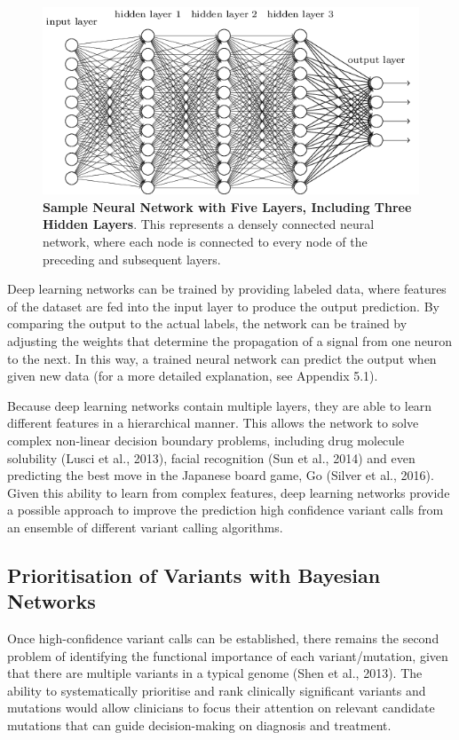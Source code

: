 \documentclass{article}
\begin{document}
\begin{figure}[H]
\includegraphics[width=\textwidth]{neuralnet.png}
\centering
\caption{\textbf{Sample Neural Network with Five Layers, Including Three Hidden Layers}. This represents a densely connected neural network, where each node is connected to every node of the preceding and subsequent layers.}
\end{figure}
Deep learning networks can be trained by providing labeled data, where features of the dataset are fed into the input layer to produce the output prediction. By comparing the output to the actual labels, the network can be trained by adjusting the weights that determine the propagation of a signal from one neuron to the next. In this way, a trained neural network can predict the output when given new data (for a more detailed explanation, see Appendix 5.1).

Because deep learning networks contain multiple layers, they are able to learn different features in a hierarchical manner. This allows the network to solve  complex non-linear decision boundary problems, including drug molecule solubility (Lusci et al., 2013), facial recognition (Sun et al., 2014) and even predicting the best move in the Japanese board game, Go (Silver et al., 2016). Given this ability to learn from complex features, deep learning networks provide a possible approach to improve the prediction high confidence variant calls from an ensemble of different variant calling algorithms.
 
\subsection{Prioritisation of Variants with Bayesian Networks }
Once high-confidence variant calls can be established, there remains the second problem of identifying the functional importance of each variant/mutation, given that there are multiple variants in a typical genome (Shen et al., 2013). The ability to systematically prioritise and rank clinically significant variants and mutations would allow clinicians to focus their attention on relevant candidate mutations that can guide decision-making on diagnosis and treatment.
\end{document}
